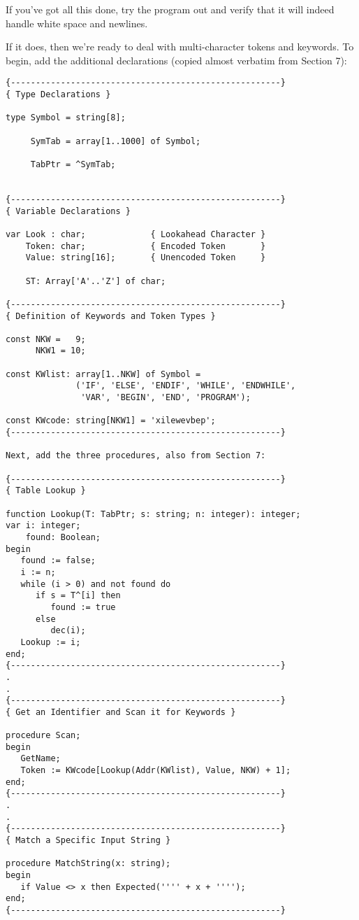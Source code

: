 If you've got all this done, try the program out and  verify that it will indeed handle white space and newlines.

If it does, then we're  ready to deal with multi-character tokens and keywords. To begin, add the additional declarations (copied almost verbatim from Section 7):

\begin{verbatim}
{------------------------------------------------------}
{ Type Declarations }

type Symbol = string[8];

     SymTab = array[1..1000] of Symbol;

     TabPtr = ^SymTab;


{------------------------------------------------------}
{ Variable Declarations }

var Look : char;             { Lookahead Character }
    Token: char;             { Encoded Token       }
    Value: string[16];       { Unencoded Token     }

    ST: Array['A'..'Z'] of char;

{------------------------------------------------------}
{ Definition of Keywords and Token Types }

const NKW =   9;
      NKW1 = 10;

const KWlist: array[1..NKW] of Symbol =
              ('IF', 'ELSE', 'ENDIF', 'WHILE', 'ENDWHILE',
               'VAR', 'BEGIN', 'END', 'PROGRAM');

const KWcode: string[NKW1] = 'xilewevbep';
{------------------------------------------------------}

Next, add the three procedures, also from Section 7:

{------------------------------------------------------}
{ Table Lookup }

function Lookup(T: TabPtr; s: string; n: integer): integer;
var i: integer;
    found: Boolean;
begin
   found := false;
   i := n;
   while (i > 0) and not found do
      if s = T^[i] then
         found := true
      else
         dec(i);
   Lookup := i;
end;
{------------------------------------------------------}
.
.
{------------------------------------------------------}
{ Get an Identifier and Scan it for Keywords }

procedure Scan;
begin
   GetName;
   Token := KWcode[Lookup(Addr(KWlist), Value, NKW) + 1];
end;
{------------------------------------------------------}
.
.
{------------------------------------------------------}
{ Match a Specific Input String }

procedure MatchString(x: string);
begin
   if Value <> x then Expected('''' + x + '''');
end;
{------------------------------------------------------}
\end{verbatim}

